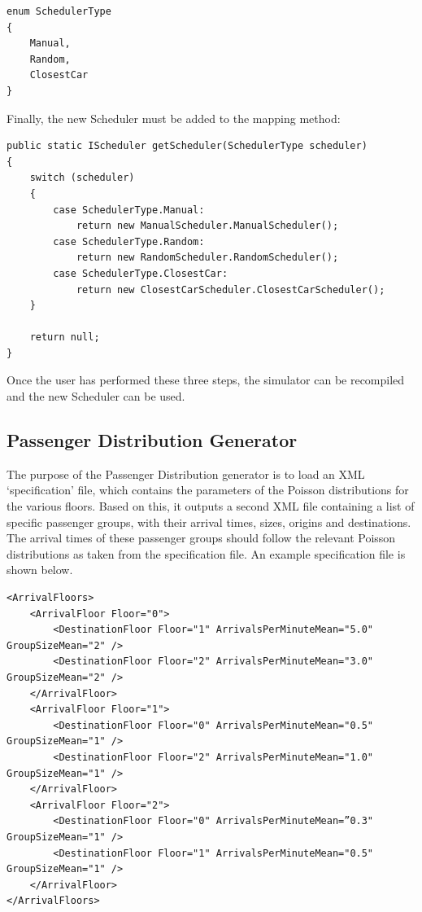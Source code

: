 \documentclass{UoYCSproject}
\begin{document}
\begin{lstlisting}
enum SchedulerType
{
	Manual,
	Random,
	ClosestCar
}
\end{lstlisting}

Finally, the new Scheduler must be added to the mapping method:

\begin{lstlisting}
public static IScheduler getScheduler(SchedulerType scheduler)
{
	switch (scheduler)
	{
		case SchedulerType.Manual:
			return new ManualScheduler.ManualScheduler();
		case SchedulerType.Random:
			return new RandomScheduler.RandomScheduler();
		case SchedulerType.ClosestCar:
			return new ClosestCarScheduler.ClosestCarScheduler();
	}
	
	return null;
}
\end{lstlisting}

Once the user has performed these three steps, the simulator can be recompiled and the new Scheduler can be used.

\subsection{Passenger Distribution Generator}

The purpose of the Passenger Distribution generator is to load an XML ‘specification’ file, which contains the parameters of the Poisson distributions for the various floors.  Based on this, it outputs a second XML file containing a list of specific passenger groups, with their arrival times, sizes, origins and destinations.  The arrival times of these passenger groups should follow the relevant Poisson distributions as taken from the specification file.  An example specification file is shown below.

\lstset{language=XML}
\begin{lstlisting}
<ArrivalFloors>
	<ArrivalFloor Floor="0">
		<DestinationFloor Floor="1" ArrivalsPerMinuteMean="5.0" GroupSizeMean="2" />
		<DestinationFloor Floor="2" ArrivalsPerMinuteMean="3.0" GroupSizeMean="2" />
	</ArrivalFloor>
	<ArrivalFloor Floor="1">
		<DestinationFloor Floor="0" ArrivalsPerMinuteMean="0.5" GroupSizeMean="1" />
		<DestinationFloor Floor="2" ArrivalsPerMinuteMean="1.0" GroupSizeMean="1" />
	</ArrivalFloor>
	<ArrivalFloor Floor="2">
		<DestinationFloor Floor="0" ArrivalsPerMinuteMean=”0.3" GroupSizeMean="1" />
		<DestinationFloor Floor="1" ArrivalsPerMinuteMean="0.5" GroupSizeMean="1" />
	</ArrivalFloor>
</ArrivalFloors>
\end{lstlisting}
\end{document}
